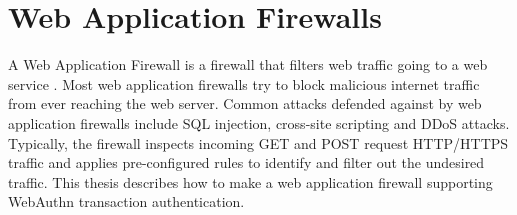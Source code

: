 \section{Web Application Firewalls}

A Web Application Firewall is a firewall that filters web traffic going to a web service \cite{web-application-firewall}. Most web application firewalls try to block malicious internet traffic from ever reaching the web server. Common attacks defended against by web application firewalls include SQL injection, cross-site scripting and DDoS attacks. Typically, the firewall inspects incoming GET and POST request HTTP/HTTPS traffic and applies pre-configured rules to identify and filter out the undesired traffic. This thesis describes how to make a web application firewall supporting WebAuthn transaction authentication.






